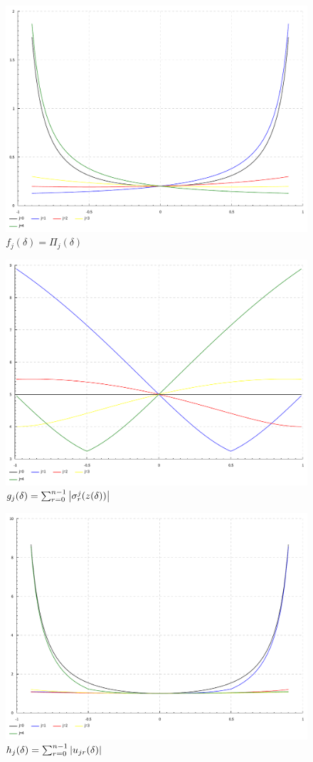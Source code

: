 \begin{figure}[htb]
    \centering
    \includegraphics[width=350pt]{images/pi_j}
    \caption{$ f_j(\delta) = \Pi_j(\delta) $}
    \label{fig:pi_j}
\end{figure}

\begin{figure}[htb]
    \centering
    \includegraphics[width=350pt]{images/sigma_row_sum}
    \caption{$ g_j(\delta) = \sum_{r=0}^{n-1} \left\lvert  \sigma_r^j(z(\delta))  \right\rvert $}
    \label{fig:sigma_row_sum}
\end{figure}

\begin{figure}[htb]
    \centering
    \includegraphics[width=350pt]{images/row_j}
    \caption{$ h_j(\delta) = \sum_{r=0}^{n-1} \left\lvert  u_{jr}(\delta)  \right\rvert $}
    \label{fig:row_j}
\end{figure}
